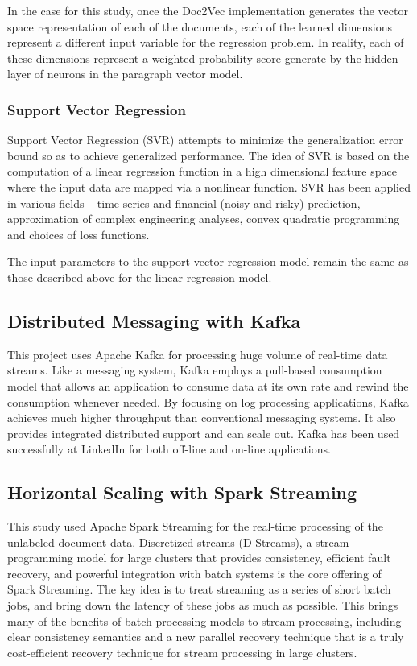 \documentclass[conference]{IEEEtran}
\begin{document}
        In the case for this study, once the Doc2Vec implementation generates the vector space representation of each of the documents, each of the learned dimensions represent a different input variable for the regression problem. In reality, each of these dimensions represent a weighted probability score generate by the hidden layer of neurons in the paragraph vector model.

    \subsubsection{Support Vector Regression}
        Support Vector Regression (SVR) attempts to minimize the generalization error bound so as to achieve generalized performance. The idea of SVR is based on the computation of a linear regression function in a high dimensional feature space where the input data are mapped via a nonlinear function. SVR has been applied in various fields – time series and financial (noisy and risky) prediction, approximation of complex engineering analyses, convex quadratic programming and choices of loss functions\cite{basak2007support}.

        The input parameters to the support vector regression model remain the same as those described above for the linear regression model.


    \subsection{Distributed Messaging with Kafka}
        This project uses Apache Kafka for processing huge volume of real-time data streams. Like a messaging system, Kafka employs a pull-based consumption model that allows an application to consume data at its own rate and rewind the consumption whenever needed. By focusing on log processing applications, Kafka achieves much higher throughput than conventional messaging systems. It also provides integrated distributed support and can scale out. Kafka has been used successfully at LinkedIn for both off-line and on-line applications. \cite{kreps2011kafka}

    \subsection{Horizontal Scaling with Spark Streaming}
        This study used Apache Spark Streaming for the real-time processing of the unlabeled document data. Discretized streams (D-Streams), a stream programming model for large clusters that provides consistency, efficient fault recovery, and powerful integration with batch systems is the core offering of Spark Streaming. The key idea is to treat streaming as a series of short batch jobs, and bring down the latency of these jobs as much as possible. This brings many of the benefits of batch processing models to stream processing, including clear consistency semantics and a new parallel recovery technique that is a truly cost-efficient recovery technique for stream processing in large clusters\cite{zaharia2012discretized}.
\end{document}
